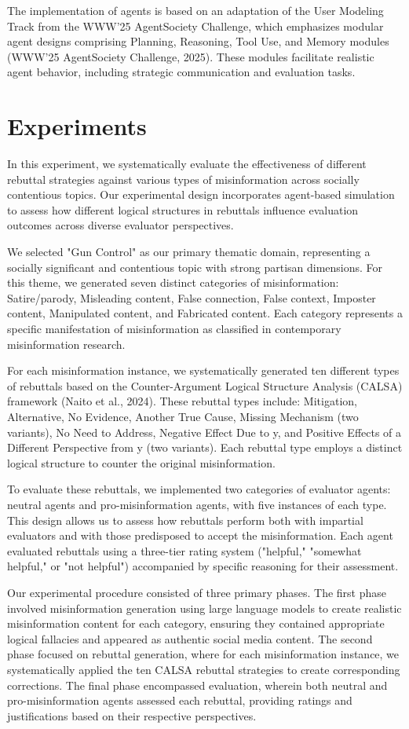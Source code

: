 \documentclass[twocolumn]{article}
\begin{document}
The implementation of agents is based on an adaptation of the User Modeling Track from the WWW'25 AgentSociety Challenge, which emphasizes modular agent designs comprising Planning, Reasoning, Tool Use, and Memory modules (WWW'25 AgentSociety Challenge, 2025). These modules facilitate realistic agent behavior, including strategic communication and evaluation tasks.

\section{Experiments}
In this experiment, we systematically evaluate the effectiveness of different rebuttal strategies against various types of misinformation across socially contentious topics. Our experimental design incorporates agent-based simulation to assess how different logical structures in rebuttals influence evaluation outcomes across diverse evaluator perspectives.

We selected "Gun Control" as our primary thematic domain, representing a socially significant and contentious topic with strong partisan dimensions. For this theme, we generated seven distinct categories of misinformation: Satire/parody, Misleading content, False connection, False context, Imposter content, Manipulated content, and Fabricated content. Each category represents a specific manifestation of misinformation as classified in contemporary misinformation research.

For each misinformation instance, we systematically generated ten different types of rebuttals based on the Counter-Argument Logical Structure Analysis (CALSA) framework (Naito et al., 2024). These rebuttal types include: Mitigation, Alternative, No Evidence, Another True Cause, Missing Mechanism (two variants), No Need to Address, Negative Effect Due to y, and Positive Effects of a Different Perspective from y (two variants). Each rebuttal type employs a distinct logical structure to counter the original misinformation.

To evaluate these rebuttals, we implemented two categories of evaluator agents: neutral agents and pro-misinformation agents, with five instances of each type. This design allows us to assess how rebuttals perform both with impartial evaluators and with those predisposed to accept the misinformation. Each agent evaluated rebuttals using a three-tier rating system ("helpful," "somewhat helpful," or "not helpful") accompanied by specific reasoning for their assessment.

Our experimental procedure consisted of three primary phases. The first phase involved misinformation generation using large language models to create realistic misinformation content for each category, ensuring they contained appropriate logical fallacies and appeared as authentic social media content. The second phase focused on rebuttal generation, where for each misinformation instance, we systematically applied the ten CALSA rebuttal strategies to create corresponding corrections. The final phase encompassed evaluation, wherein both neutral and pro-misinformation agents assessed each rebuttal, providing ratings and justifications based on their respective perspectives.
\end{document}
